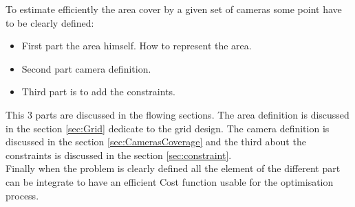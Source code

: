 


To estimate efficiently the area cover by a given set of cameras some point have to be clearly defined: 
\begin{itemize}
\item First part the area himself. How to represent the area. 
\item Second part camera definition. 
\item Third part is to add the constraints. 
\end{itemize} 
 This 3 parts are discussed in the flowing sections. The area definition is discussed in the section \ref{sec:Grid} dedicate to the grid design. The camera definition is discussed in the section \ref{sec:CamerasCoverage} and the third about the constraints is discussed in the section \ref{sec:constraint}.\\
Finally when the problem is clearly defined all the element of the different part can be integrate to have an efficient Cost function usable for the optimisation process.

   
%
%
% 

